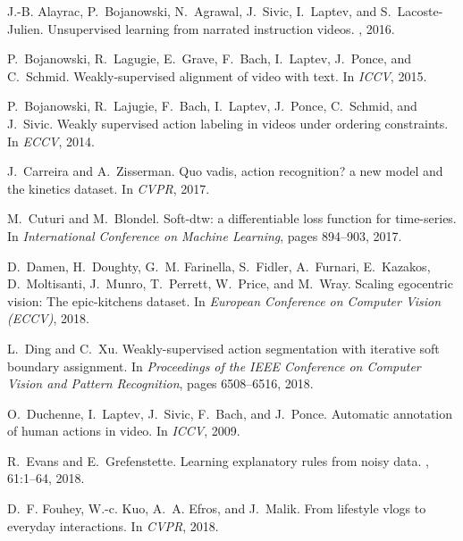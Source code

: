 \documentclass[10pt,twocolumn,letterpaper]{article}
\begin{document}
{\small

\begin{thebibliography}{10}\itemsep=-1pt

J.-B. Alayrac, P.~Bojanowski, N.~Agrawal, J.~Sivic, I.~Laptev, and
  S.~Lacoste-Julien.
\newblock Unsupervised learning from narrated instruction videos.
, 2016.

P.~Bojanowski, R.~Lagugie, E.~Grave, F.~Bach, I.~Laptev, J.~Ponce, and
  C.~Schmid.
\newblock Weakly-supervised alignment of video with text.
\newblock In {\em ICCV}, 2015.

P.~Bojanowski, R.~Lajugie, F.~Bach, I.~Laptev, J.~Ponce, C.~Schmid, and
  J.~Sivic.
\newblock Weakly supervised action labeling in videos under ordering
  constraints.
\newblock In {\em ECCV}, 2014.

J.~Carreira and A.~Zisserman.
\newblock Quo vadis, action recognition? a new model and the kinetics dataset.
\newblock In {\em CVPR}, 2017.

M.~Cuturi and M.~Blondel.
\newblock Soft-dtw: a differentiable loss function for time-series.
\newblock In {\em International Conference on Machine Learning}, pages
  894--903, 2017.

D.~Damen, H.~Doughty, G.~M. Farinella, S.~Fidler, A.~Furnari, E.~Kazakos,
  D.~Moltisanti, J.~Munro, T.~Perrett, W.~Price, and M.~Wray.
\newblock Scaling egocentric vision: The epic-kitchens dataset.
\newblock In {\em European Conference on Computer Vision (ECCV)}, 2018.

L.~Ding and C.~Xu.
\newblock Weakly-supervised action segmentation with iterative soft boundary
  assignment.
\newblock In {\em Proceedings of the IEEE Conference on Computer Vision and
  Pattern Recognition}, pages 6508--6516, 2018.

O.~Duchenne, I.~Laptev, J.~Sivic, F.~Bach, and J.~Ponce.
\newblock Automatic annotation of human actions in video.
\newblock In {\em ICCV}, 2009.

R.~Evans and E.~Grefenstette.
\newblock Learning explanatory rules from noisy data.
, 61:1--64, 2018.

D.~F. Fouhey, W.-c. Kuo, A.~A. Efros, and J.~Malik.
\newblock From lifestyle vlogs to everyday interactions.
\newblock In {\em CVPR}, 2018.


\end{thebibliography}}
\end{document}
